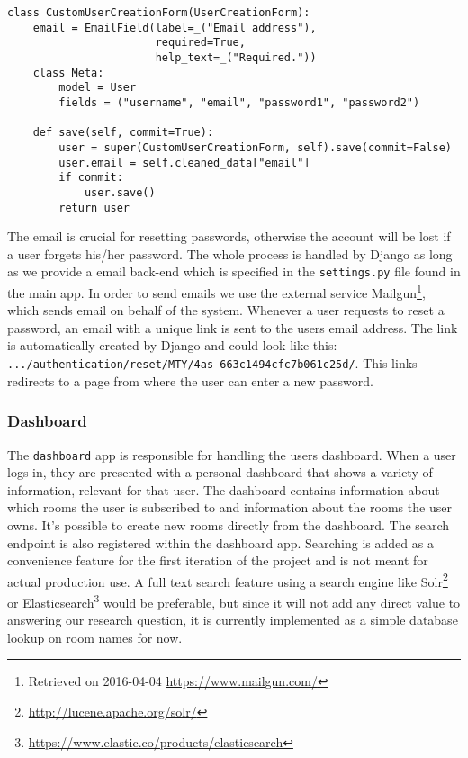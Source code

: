 \begin{lstlisting}[caption=CustomUserCreationForm class, label=lst:custom-user-creation-form-class]
class CustomUserCreationForm(UserCreationForm):
    email = EmailField(label=_("Email address"),
                       required=True, 
                       help_text=_("Required."))
    class Meta:
        model = User
        fields = ("username", "email", "password1", "password2")

    def save(self, commit=True):
        user = super(CustomUserCreationForm, self).save(commit=False)
        user.email = self.cleaned_data["email"]
        if commit:
            user.save()
        return user
\end{lstlisting}

The email is crucial for resetting passwords, otherwise the account will be lost if a user forgets his/her password. The whole process is handled by Django as long as we provide a email back-end which is specified in the \texttt{settings.py} file found in the main app. In order to send emails we use the external service Mailgun\footnote{Retrieved on 2016-04-04 \url{https://www.mailgun.com/}}, which sends email on behalf of the system. Whenever a user requests to reset a password, an email with a unique link is sent to the users email address. The link is automatically created by Django and could look like this:  \texttt{.../authentication/reset/MTY/4as-663c1494cfc7b061c25d/}. This links redirects to a page from where the user can enter a new password.

\subsubsection*{Dashboard}
The \texttt{dashboard} app is responsible for handling the users dashboard. When a user logs in, they are presented with a personal dashboard that shows a variety of information, relevant for that user.
The dashboard contains information about which rooms the user is subscribed to and information about the rooms the user owns. It's possible to create new rooms directly from the dashboard. The search endpoint is also registered within the dashboard app. Searching is added as a convenience feature for the first iteration of the project and is not meant for actual production use. A full text search feature using a search engine like Solr\footnote{\url{http://lucene.apache.org/solr/}} or Elasticsearch\footnote{\url{https://www.elastic.co/products/elasticsearch}} would be preferable, but since it will not add any direct value to answering our research question, it is currently implemented as a simple database lookup on room names for now.

